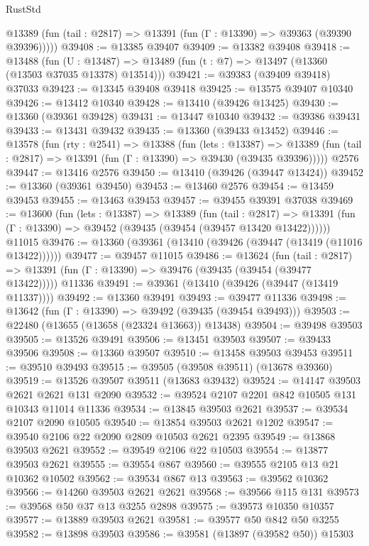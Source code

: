 \begin{lexlean}{RustStd}
\begin{coremodule}
      @13389 (fun (tail : @2817) => @13391 (fun (Γ : @13390) => @39363 (@39390 @39396)))))
@39408 := @13385 @39407
@39409 := @13382 @39408
@39418 := @13488
    (fun (U : @13487) => @13489 (fun (t : @7) => @13497 (@13360 (@13503 @37035 @13378) @13514)))
@39421 := @39383 (@39409 @39418) @37033
@39423 := @13345 @39408 @39418
@39425 := @13575 @39407 @10340
@39426 := @13412 @10340
@39428 := @13410 (@39426 @13425)
@39430 := @13360 (@39361 @39428)
@39431 := @13447 @10340
@39432 := @39386 @39431
@39433 := @13431 @39432
@39435 := @13360 (@39433 @13452)
@39446 := @13578
    (fun (rty : @2541) =>
    @13388
      (fun (lets : @13387) =>
      @13389 (fun (tail : @2817) => @13391 (fun (Γ : @13390) => @39430 (@39435 @39396)))))
    @2576
@39447 := @13416 @2576
@39450 := @13410 (@39426 (@39447 @13424))
@39452 := @13360 (@39361 @39450)
@39453 := @13460 @2576
@39454 := @13459 @39453
@39455 := @13463 @39453
@39457 := @39455 @39391 @37038
@39469 := @13600
    (fun (lets : @13387) =>
    @13389
      (fun (tail : @2817) =>
      @13391 (fun (Γ : @13390) => @39452 (@39435 (@39454 (@39457 @13420 @13422))))))
    @11015
@39476 := @13360 (@39361 (@13410 (@39426 (@39447 (@13419 (@11016 @13422))))))
@39477 := @39457 @11015
@39486 := @13624
    (fun (tail : @2817) => @13391 (fun (Γ : @13390) => @39476 (@39435 (@39454 (@39477 @13422)))))
    @11336
@39491 := @39361 (@13410 (@39426 (@39447 (@13419 @11337))))
@39492 := @13360 @39491
@39493 := @39477 @11336
@39498 := @13642 (fun (Γ : @13390) => @39492 (@39435 (@39454 @39493)))
@39503 := @22480 (@13655 (@13658 (@23324 @13663)) @13438)
@39504 := @39498 @39503
@39505 := @13526 @39491
@39506 := @13451 @39503
@39507 := @39433 @39506
@39508 := @13360 @39507
@39510 := @13458 @39503 @39453
@39511 := @39510 @39493
@39515 := @39505 (@39508 @39511) (@13678 @39360)
@39519 := @13526 @39507 @39511 (@13683 @39432)
@39524 := @14147 @39503 @2621 @2621 @131 @2090
@39532 := @39524 @2107 @2201 @842 @10505 @131 @10343 @11014 @11336
@39534 := @13845 @39503 @2621
@39537 := @39534 @2107 @2090 @10505
@39540 := @13854 @39503 @2621 @1202
@39547 := @39540 @2106 @22 @2090 @2809 @10503 @2621 @2395
@39549 := @13868 @39503 @2621
@39552 := @39549 @2106 @22 @10503
@39554 := @13877 @39503 @2621
@39555 := @39554 @867
@39560 := @39555 @2105 @13 @21 @10362 @10502
@39562 := @39534 @867 @13
@39563 := @39562 @10362
@39566 := @14260 @39503 @2621 @2621
@39568 := @39566 @115 @131
@39573 := @39568 @50 @37 @13 @3255 @2898
@39575 := @39573 @10350 @10357
@39577 := @13889 @39503 @2621
@39581 := @39577 @50 @842 @50 @3255
@39582 := @13898 @39503
@39586 := @39581 (@13897 (@39582 @50)) @15303

\end{coremodule}
\end{lexlean}

